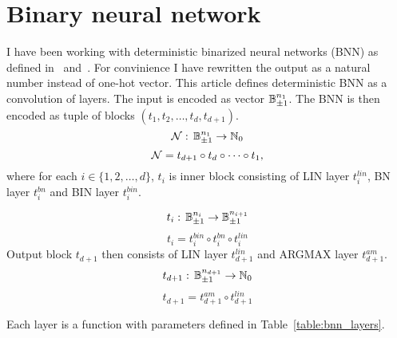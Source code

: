 \documentclass{fithesis}
\begin{document}
\section{Binary neural network}\label{section:binneurnetw}
I have been working with deterministic binarized neural networks (BNN)
as defined in~\cite{Hubara2016BinarizedNN} and~\cite{10.1145/3563212}.
For convinience I have rewritten the output as a natural number instead of
one-hot vector.
This article defines deterministic BNN as a convolution of layers.
The input is
encoded as vector $\mathbb{B}_{\pm 1}^{n_1}$. The BNN is then encoded as tuple of blocks
$(t_1, t_2, \dots, t_d, t_{d+1})$.
\begin{equation*}
    \mathcal{N}: \, \mathbb{B}_{\pm 1}^{n_1} \to \mathbb{N}_0
\end{equation*}
\begin{equation}
    \mathcal{N} = t_{d+1} \circ t_d \circ \dots \circ t_1,
\end{equation}
where for each $i\in \{1, 2, \dots, d\}$, $t_i$ is inner block consisting
of LIN layer $t_i^{lin}$, BN layer $t_i^{bn}$ and BIN layer $t_i^{bin}$.

\begin{equation*}
    t_i: \, \mathbb{B}_{\pm 1}^{n_i} \to \mathbb{B}_{\pm 1}^{n_{i+1}}
\end{equation*}
\begin{equation}
    t_i = t_i^{bin} \circ t_i^{bn} \circ t_i^{lin}
\end{equation}
Output block $t_{d+1}$ then consists of LIN layer $t_{d+1}^{lin}$ and ARGMAX layer
$t_{d+1}^{am}$.
\begin{equation*}
    t_{d+1}: \, \mathbb{B}_{\pm 1}^{n_{d+1}} \to \mathbb{N}_0
\end{equation*}
\begin{equation}
    t_{d+1} = t_{d+1}^{am} \circ t_{d+1}^{lin}
\end{equation}

Each layer is a function with parameters defined in Table~\ref{table:bnn_layers}.
\end{document}
